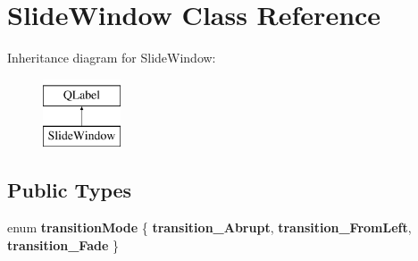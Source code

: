 \hypertarget{classSlideWindow}{}\section{Slide\+Window Class Reference}
\label{classSlideWindow}
Inheritance diagram for Slide\+Window\+:\begin{figure}[H]
\begin{center}
\leavevmode
\includegraphics[height=2.000000cm]{d1/d5b/classSlideWindow}
\end{center}
\end{figure}
\subsection*{Public Types}
\begin{DoxyCompactItemize}
\item 
\mbox{\label{classSlideWindow_aa352c11c452cb40358b09ecb2a98cb1a}} 
enum {\bfseries transition\+Mode} \{ {\bfseries transition\+\_\+\+Abrupt}, 
{\bfseries transition\+\_\+\+From\+Left}, 
{\bfseries transition\+\_\+\+Fade}
 \}
\end{DoxyCompactItemize}
